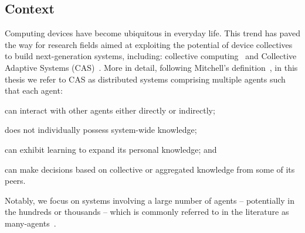 \documentclass[runningheads]{llncs}
\begin{document}
\subsection{Context}
Computing devices have become ubiquitous in everyday life.
%
This trend has paved the way for research fields aimed at exploiting
 the potential of device collectives to build next-generation systems, 
 including: collective computing~\cite{DBLP:journals/computer/Abowd16}
 and Collective Adaptive Systems (CAS)~\cite{DBLP:journals/sttt/WirsingJN23,robyphdthesis}.
%
More in detail, following Mitchell's definition~\cite{DBLP:conf/metacognition/Mitchell05}, 
 in this thesis we refer to CAS as distributed systems comprising multiple agents 
 such that each agent:
 \begin{enumerate*}[label=(\roman*)]
	\item can interact with other agents either directly or indirectly;
	\item does not individually possess system-wide knowledge;
	\item can exhibit learning to expand its personal knowledge; and
	\item can make decisions based on collective or aggregated knowledge from some of its peers.
 \end{enumerate*}
%
Notably, we focus on systems involving a large number of agents -- potentially in the hundreds
 or thousands -- which is commonly referred to in the literature 
 as many-agents~\cite{DBLP:phd/ethos/Yang21a}.
\end{document}
